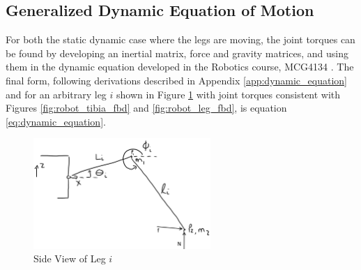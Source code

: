 \subsection{Generalized Dynamic Equation of Motion} \label{subsec:dynamic_equation}

For both the static dynamic case where the legs are moving, the joint torques can be found by developing an inertial matrix, force and gravity matrices, and using them in the dynamic equation developed in the Robotics course, MCG4134 \cite{al-jarrah_mcg4134:_2019}.
The final form, following derivations described in Appendix \ref{app:dynamic_equation} and for an arbitrary leg $i$ shown in Figure \ref{fig:dynamic_leg} with joint torques consistent with Figures \ref{fig:robot_tibia_fbd} and \ref{fig:robot_leg_fbd}, is equation \ref{eq:dynamic_equation}.

\begin{figure}[H]
    \centering
    \includegraphics[width=0.6\textwidth]{5_KinematicAndForces/img/dynamic_leg.png}
    \caption{Side View of Leg $i$}
    \label{fig:dynamic_leg}
\end{figure}

